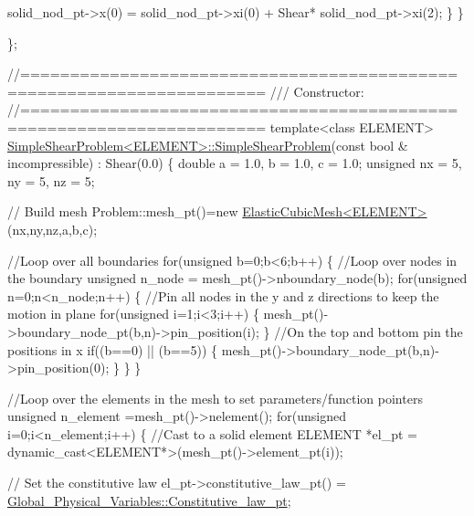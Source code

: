 \begin{DoxyCodeInclude}
     solid\_nod\_pt->x(0) = solid\_nod\_pt->xi(0) + Shear*
      solid\_nod\_pt->xi(2);
    \}
  \}

\};

\textcolor{comment}{//====================================================================== }\textcolor{comment}{}
\textcolor{comment}{/// Constructor: }
\textcolor{comment}{}\textcolor{comment}{//====================================================================== }
\textcolor{keyword}{template}<\textcolor{keyword}{class} ELEMENT>
\hyperlink{classSimpleShearProblem_ada0881781b3332f88362528be39613d2}{SimpleShearProblem<ELEMENT>::SimpleShearProblem}(\textcolor{keyword}{const} \textcolor{keywordtype}{bool} &
      incompressible) 
 : Shear(0.0)
\{
 \textcolor{keywordtype}{double} a = 1.0, b = 1.0, c = 1.0;
 \textcolor{keywordtype}{unsigned} nx = 5, ny = 5, nz = 5;

 \textcolor{comment}{// Build mesh}
 Problem::mesh\_pt()=\textcolor{keyword}{new} \hyperlink{classElasticCubicMesh}{ElasticCubicMesh<ELEMENT>}(nx,ny,nz,a,b,c);
 
 \textcolor{comment}{//Loop over all boundaries}
 \textcolor{keywordflow}{for}(\textcolor{keywordtype}{unsigned} b=0;b<6;b++)
  \{
   \textcolor{comment}{//Loop over nodes in the boundary}
   \textcolor{keywordtype}{unsigned} n\_node = mesh\_pt()->nboundary\_node(b);
   \textcolor{keywordflow}{for}(\textcolor{keywordtype}{unsigned} n=0;n<n\_node;n++)
    \{
     \textcolor{comment}{//Pin all nodes in the y and z directions to keep the motion in plane}
     \textcolor{keywordflow}{for}(\textcolor{keywordtype}{unsigned} i=1;i<3;i++)
      \{
       mesh\_pt()->boundary\_node\_pt(b,n)->pin\_position(i); 
      \}
     \textcolor{comment}{//On the top and bottom pin the positions in x}
     \textcolor{keywordflow}{if}((b==0) || (b==5))
      \{
       mesh\_pt()->boundary\_node\_pt(b,n)->pin\_position(0);
      \}
    \}
  \}
 
 \textcolor{comment}{//Loop over the elements in the mesh to set parameters/function pointers}
 \textcolor{keywordtype}{unsigned}  n\_element =mesh\_pt()->nelement();
 \textcolor{keywordflow}{for}(\textcolor{keywordtype}{unsigned} i=0;i<n\_element;i++)
  \{
   \textcolor{comment}{//Cast to a solid element}
   ELEMENT *el\_pt = \textcolor{keyword}{dynamic\_cast<}ELEMENT*\textcolor{keyword}{>}(mesh\_pt()->element\_pt(i));
   
   \textcolor{comment}{// Set the constitutive law}
   el\_pt->constitutive\_law\_pt() =
    \hyperlink{namespaceGlobal__Physical__Variables_a5d5f19442938130d36ee7476ae25049c}{Global\_Physical\_Variables::Constitutive\_law\_pt};


\end{DoxyCodeInclude}
